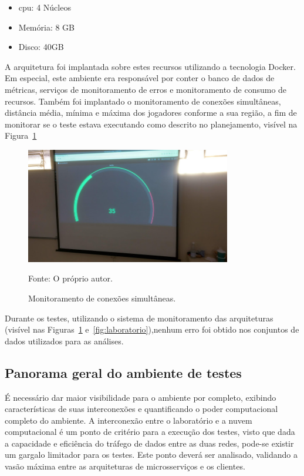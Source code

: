 \begin{itemize}
  \item \ac{cpu}: 4 Núcleos
  \item Memória: 8 GB
  \item Disco: 40GB
\end{itemize}

A arquitetura foi implantada sobre estes recursos utilizando a tecnologia Docker. Em especial, este ambiente era responsável por conter o banco de dados de métricas, serviços de monitoramento de erros e monitoramento de consumo de recursos.
%
Também foi implantado o monitoramento de conexões simultâneas, distância média, mínima e máxima dos jogadores conforme a sua região, a fim de monitorar se o teste estava executando como descrito no planejamento, visível na Figura~\ref{fig:lab_monitor}

\begin{figure}[htb!]
  \caption{Monitoramento de conexões simultâneas.}
  \label{fig:lab_monitor}
  \includegraphics[width=0.8\textwidth]{figuras/network/metrics.jpg}
  \centering

  Fonte: O próprio autor.
\end{figure}

Durante os testes, utilizando o sistema de monitoramento das arquiteturas (visível nas Figuras~\ref{fig:lab_monitor} e~\ref{fig:laboratorio}),nenhum erro foi obtido nos conjuntos de dados utilizados para as análises.

\subsection{Panorama geral do ambiente de testes}
\label{sec:nuvem_lab}

É necessário dar maior visibilidade para o ambiente por completo, exibindo características de suas interconexões e quantificando o poder computacional completo do ambiente.
%
A interconexão entre o laboratório e a nuvem computacional é um ponto de critério para a execução dos testes, visto que dada a capacidade e eficiência do tráfego de dados entre as duas redes, pode-se existir um gargalo limitador para os testes.
%
Este ponto deverá ser analisado, validando a vasão máxima entre as arquiteturas de microsserviços e os clientes.
